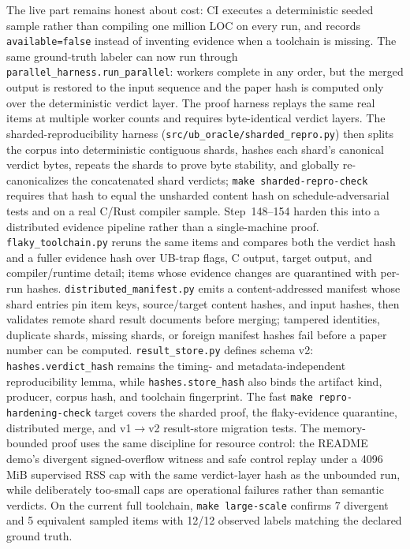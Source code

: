 \documentclass[10pt,a4paper]{article}
\begin{document}
The live part remains honest about cost: CI executes a deterministic seeded
sample rather than compiling one million LOC on every run, and records
\texttt{available=false} instead of inventing evidence when a toolchain is
missing.  The same ground-truth labeler can now run through
\texttt{parallel\_harness.run\_parallel}: workers complete in any order, but the
merged output is restored to the input sequence and the paper hash is computed
only over the deterministic verdict layer.  The proof harness replays the same
real items at multiple worker counts and requires byte-identical verdict layers.
The sharded-reproducibility harness
(\texttt{src/ub\_oracle/sharded\_repro.py}) then splits the corpus into
deterministic contiguous shards, hashes each shard's canonical verdict bytes,
repeats the shards to prove byte stability, and globally re-canonicalizes the
concatenated shard verdicts; \texttt{make sharded-repro-check} requires that hash
to equal the unsharded content hash on schedule-adversarial tests and on a real
C/Rust compiler sample.
Step~148--154 harden this into a distributed evidence pipeline rather than a
single-machine proof.  \texttt{flaky\_toolchain.py} reruns the same items and
compares both the verdict hash and a fuller evidence hash over UB-trap flags,
C output, target output, and compiler/runtime detail; items whose evidence changes
are quarantined with per-run hashes.  \texttt{distributed\_manifest.py} emits a
content-addressed manifest whose shard entries pin item keys, source/target
content hashes, and input hashes, then validates remote shard result documents
before merging; tampered identities, duplicate shards, missing shards, or foreign
manifest hashes fail before a paper number can be computed.  \texttt{result\_store.py}
defines schema v2: \texttt{hashes.verdict\_hash} remains the timing- and
metadata-independent reproducibility lemma, while \texttt{hashes.store\_hash}
also binds the artifact kind, producer, corpus hash, and toolchain fingerprint.
The fast \texttt{make repro-hardening-check} target covers the sharded proof, the
flaky-evidence quarantine, distributed merge, and v1$\to$v2 result-store
migration tests.
The memory-bounded proof uses the same discipline for resource control: the
README demo's divergent signed-overflow witness and safe control replay under a
4096\,MiB supervised RSS cap with the same verdict-layer hash as the unbounded
run, while deliberately too-small caps are operational failures rather than
semantic verdicts.
On the current full toolchain, \texttt{make large-scale} confirms
7 divergent and 5 equivalent sampled items with 12/12 observed labels matching
the declared ground truth.
\end{document}
